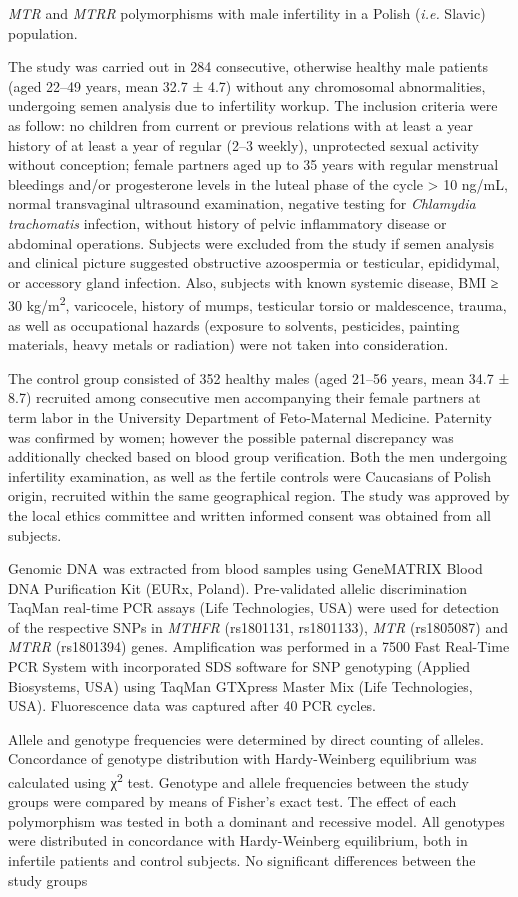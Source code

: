 \textit{MTR} and \textit{MTRR} polymorphisms with male infertility in a Polish (\textit{i.e.} Slavic) population.\par The study was carried out in 284 consecutive, otherwise healthy male patients (aged 22–49 years, mean 32.7 ± 4.7) without any chromosomal abnormalities, undergoing semen analysis due to infertility workup. The inclusion criteria were as follow: no children from current or previous relations with at least a year history of at least a year of regular (2–3 weekly), unprotected sexual activity without conception; female partners aged up to 35 years with regular menstrual bleedings and/or progesterone levels in the luteal phase of the cycle > 10 ng/mL, normal transvaginal ultrasound examination, negative testing for \textit{Chlamydia trachomatis} infection, without history of pelvic inflammatory disease or abdominal operations. Subjects were excluded from the study if semen analysis and clinical picture suggested obstructive azoospermia or testicular, epididymal, or accessory gland infection. Also, subjects with known systemic disease, BMI ≥ 30 kg/m\textsuperscript{2}, varicocele, history of mumps, testicular torsio or maldescence, trauma, as well as occupational hazards (exposure to solvents, pesticides, painting materials, heavy metals or radiation) were not taken into consideration.\par The control group consisted of 352 healthy males (aged 21–56 years, mean 34.7 ± 8.7) recruited among consecutive men accompanying their female partners at term labor in the University Department of Feto-Maternal Medicine. Paternity was confirmed by women; however the possible paternal discrepancy was additionally checked based on blood group verification. Both the men undergoing infertility examination, as well as the fertile controls were Caucasians of Polish origin, recruited within the same geographical region. The study was approved by the local ethics committee and written informed consent was obtained from all subjects.\par Genomic DNA was extracted from blood samples using GeneMATRIX Blood DNA Purification Kit (EURx, Poland). Pre-validated allelic discrimination TaqMan real-time PCR assays (Life Technologies, USA) were used for detection of the respective SNPs in \textit{MTHFR} (rs1801131, rs1801133), \textit{MTR} (rs1805087) and \textit{MTRR} (rs1801394) genes. Amplification was performed in a 7500 Fast Real-Time PCR System with incorporated SDS software for SNP genotyping (Applied Biosystems, USA) using TaqMan GTXpress Master Mix (Life Technologies, USA). Fluorescence data was captured after 40 PCR cycles.\par Allele and genotype frequencies were determined by direct counting of alleles. Concordance of genotype distribution with Hardy-Weinberg equilibrium was calculated using χ\textsuperscript{2} test. Genotype and allele frequencies between the study groups were compared by means of Fisher’s exact test. The effect of each polymorphism was tested in both a dominant and recessive model. All genotypes were distributed in concordance with Hardy-Weinberg equilibrium, both in infertile patients and control subjects. No significant differences between the study groups 